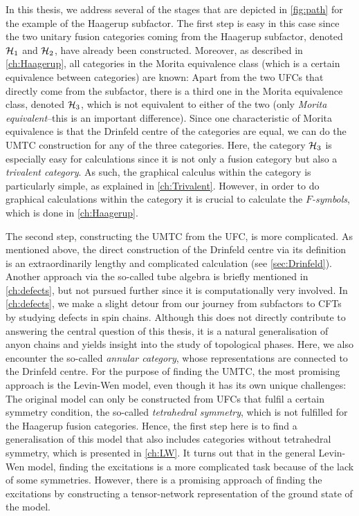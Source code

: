 In this thesis, we address several of the stages that are depicted in \cref{fig:path} for the example of the Haagerup subfactor. The first step is easy in this case since the two unitary fusion categories coming from the Haagerup subfactor, denoted ${\mathcal{H}}_1$ and ${\mathcal{H}}_2$, have already been constructed. Moreover, as described in \cref{ch:Haagerup}, all categories in the Morita equivalence class (which is a certain equivalence between categories) are known: Apart from the two UFCs that directly come from the subfactor, there is a third one in the Morita equivalence class, denoted ${\mathcal{H}_3}$, which is not equivalent to either of the two (only \emph{Morita equivalent}--this is an important difference). Since one characteristic of Morita equivalence is that the Drinfeld centre of the categories are equal, we can do the UMTC construction for any of the three categories. Here, the category ${\mathcal{H}_3}$ is especially easy for calculations since it is not only a fusion category but also a \emph{trivalent category}. As such, the graphical calculus within the category is particularly simple, as explained in \cref{ch:Trivalent}. However, in order to do graphical calculations within the category it is crucial to calculate the $F$\emph{-symbols}, which is done in \cref{ch:Haagerup}.

The second step, constructing the UMTC from the UFC, is more complicated. As mentioned above, the direct construction of the Drinfeld centre via its definition is an extraordinarily lengthy and complicated calculation (see \cref{sec:Drinfeld}). Another approach via the so-called tube algebra is briefly mentioned in \cref{ch:defects}, but not pursued further since it is computationally very involved. In \cref{ch:defects}, we make a slight detour from our journey from subfactors to CFTs by studying defects in spin chains. Although this does not directly contribute to answering the central question of this thesis, it is a natural generalisation of anyon chains and yields insight into the study of topological phases. Here, we also encounter the so-called \emph{annular category}, whose representations are connected to the Drinfeld centre. For the purpose of finding the UMTC, the most promising approach is the Levin-Wen model, even though it has its own unique challenges: The original model can only be constructed from UFCs that fulfil a certain symmetry condition, the so-called \emph{tetrahedral symmetry}, which is not fulfilled for the Haagerup fusion categories. Hence, the first step here is to find a generalisation of this model that also includes categories without tetrahedral symmetry, which is presented in \cref{ch:LW}. It turns out that in the general Levin-Wen model, finding the excitations is a more complicated task because of the lack of some symmetries. However, there is a promising approach of finding the excitations by constructing a tensor-network representation of the ground state of the model.

